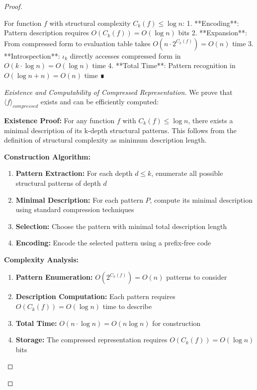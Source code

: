 \documentclass[11pt]{article}
\begin{document}
\begin{proof}
\begin{enumerate}
\begin{lemma}
For function $f$ with structural complexity $C_k(f) \leq \log n$:
1. **Encoding**: Pattern description requires $O(C_k(f)) = O(\log n)$ bits
2. **Expansion**: From compressed form to evaluation table takes $O(n \cdot 2^{C_k(f)}) = O(n)$ time
3. **Introspection**: $\iota_k$ directly accesses compressed form in $O(k \cdot \log n) = O(\log n)$ time
4. **Total Time**: Pattern recognition in $O(\log n + n) = O(n)$ time ∎
\end{lemma}

\begin{proof}[Existence and Computability of Compressed Representation]
We prove that $\langle f \rangle_{compressed}$ exists and can be efficiently computed:

\textbf{Existence Proof:}
For any function $f$ with $C_k(f) \leq \log n$, there exists a minimal description of its k-depth structural patterns. This follows from the definition of structural complexity as minimum description length.

\textbf{Construction Algorithm:}
\begin{enumerate}
\item \textbf{Pattern Extraction:} For each depth $d \leq k$, enumerate all possible structural patterns of depth $d$
\item \textbf{Minimal Description:} For each pattern $P$, compute its minimal description using standard compression techniques
\item \textbf{Selection:} Choose the pattern with minimal total description length
\item \textbf{Encoding:} Encode the selected pattern using a prefix-free code
\end{enumerate}

\textbf{Complexity Analysis:}
\begin{enumerate}
\item \textbf{Pattern Enumeration:} $O(2^{C_k(f)}) = O(n)$ patterns to consider
\item \textbf{Description Computation:} Each pattern requires $O(C_k(f)) = O(\log n)$ time to describe
\item \textbf{Total Time:} $O(n \cdot \log n) = O(n \log n)$ for construction
\item \textbf{Storage:} The compressed representation requires $O(C_k(f)) = O(\log n)$ bits
\end{enumerate}


\end{proof}
\end{enumerate}
\end{proof}
\end{document}
